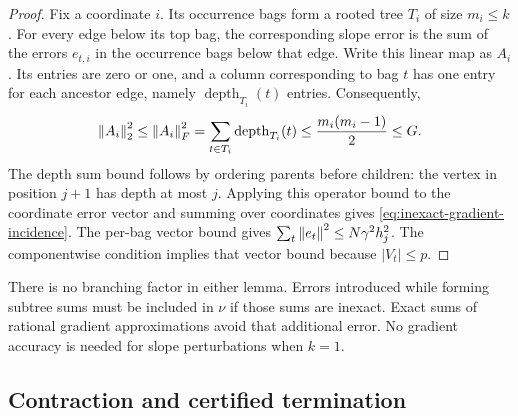 \begin{proof}
Fix a coordinate $i$.  Its occurrence bags form a rooted tree $T_i$ of
size $m_i\le k$.  For every edge below its top bag, the corresponding
slope error is the sum of the errors $e_{t,i}$ in the occurrence bags
below that edge.  Write this linear map as $A_i$.  Its entries are zero
or one, and a column corresponding to bag $t$ has one entry for each
ancestor edge, namely $\operatorname{depth}_{T_i}(t)$ entries.
Consequently,
\[
 \left\lVert A_i\right\rVert_2^2\le\left\lVert A_i\right\rVert_F^2
       =\sum_{t\in T_i}\operatorname{depth}_{T_i}(t)
       \le\frac{m_i(m_i-1)}2\le G.
\]
The depth sum bound follows by ordering parents before children: the
vertex in position $j+1$ has depth at most $j$.  Applying this operator
bound to the coordinate error vector and summing over coordinates gives
\eqref{eq:inexact-gradient-incidence}.  The per-bag vector bound gives
$\sum_t\left\lVert e_t\right\rVert^2\le N\gamma^2h_j^2$.  The componentwise condition
implies that vector bound because $|V_t|\le p$.
\end{proof}

There is no branching factor in either lemma.  Errors introduced while
forming subtree sums must be included in $\nu$ if those sums are
inexact.  Exact sums of rational gradient approximations avoid that
additional error.  No gradient accuracy is needed for slope
perturbations when $k=1$.

\subsection{Contraction and certified termination}

